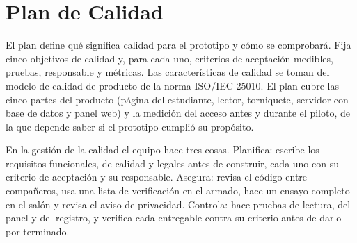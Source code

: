 \section{Plan de Calidad}
\label{sec:calidad}
El plan define qué significa calidad para el prototipo y cómo se comprobará.
Fija cinco objetivos de calidad y, para cada uno, criterios de aceptación
medibles, pruebas, responsable y métricas. Las características de calidad se
toman del modelo de calidad de producto de la norma ISO/IEC 25010. El plan
cubre las cinco partes del producto (página del estudiante, lector, torniquete,
servidor con base de datos y panel web) y la medición del acceso antes y durante
el piloto, de la que depende saber si el prototipo cumplió su propósito.

En la gestión de la calidad el equipo hace tres cosas. Planifica: escribe los
requisitos funcionales, de calidad y legales antes de construir, cada uno con
su criterio de aceptación y su responsable. Asegura: revisa el código entre
compañeros, usa una lista de verificación en el armado, hace un ensayo completo
en el salón y revisa el aviso de privacidad. Controla: hace pruebas de lectura,
del panel y del registro, y verifica cada entregable contra su criterio antes
de darlo por terminado.

